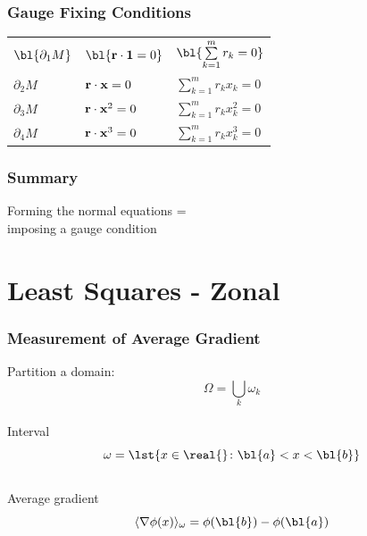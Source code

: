 \documentclass[]{beamer}
\begin{document}
\begin{frame}      %
\frametitle{Gauge Fixing Conditions}
  \begin{table}[htdp]
    \begin{center}
      \begin{tabular}{lll}
        $\bl{\partial_{1}M}$ & $\bl{{\bf{r}} \cdot {\bf{1}} = 0}$     & $\bl{\sum\limits_{k = 1}^{m} r_{k} = 0}$ \\[15pt]
        $\partial_{2}M$ & ${\bf{r}} \cdot {\bf{x}} = 0$     & $\sum\limits_{k = 1}^{m} r_{k}x_{k} = 0$ \\[15pt]
        $\partial_{3}M$ & ${\bf{r}} \cdot {\bf{x}}^{2} = 0$ & $\sum\limits_{k = 1}^{m} r_{k}x_{k}^{2} = 0$ \\[15pt]
        $\partial_{4}M$ & ${\bf{r}} \cdot {\bf{x}}^{3} = 0$ & $\sum\limits_{k = 1}^{m} r_{k}x_{k}^{3} = 0$ \\[15pt]
      \end{tabular}
    \end{center}
  \end{table}%
  \twodots
\end{frame}

\begin{frame}      %
\frametitle{Summary}
    \begin{center}
      \Huge{Forming the normal equations =\\
      imposing a gauge condition}
    \end{center}
  \twodots
\end{frame}

\section{Least Squares - Zonal}

\begin{frame}      %
\frametitle{Measurement of Average Gradient}
	Partition a domain: \\
	$$\Omega = \bigcup_{k} \omega_{k}$$ \\
  Interval \\
  $$\omega = \lst{x \in\real{} \colon \bl{a} < x < \bl{b}}$$ \\
  \pause
  Average gradient \\
  $$\langle \nabla \phi(x) \rangle_{\omega} = \phi(\bl{b}) - \phi(\bl{a})$$
  \onedot
\end{frame}
\end{document}
